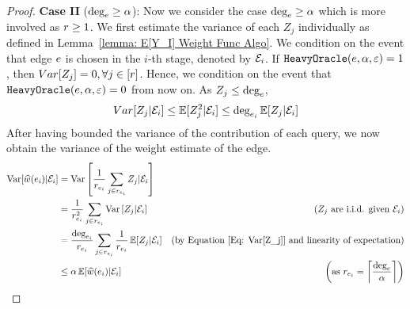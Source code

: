 \begin{lemma}
\begin{proof}
        {\bf Case II }($\mbox{deg}_{e} \geq \alpha$):
        Now we consider the case $\mbox{deg}_{e} \geq \alpha$ which is more involved as $r \geq 1$. We first estimate the variance of each $Z_j$ individually as defined in Lemma~\ref{lemma: E[Y_I] Weight Func Algo}. We condition on the event that edge $e$ is chosen in the $i$-th stage, denoted by $\mathcal{E}_i$. If $\texttt{HeavyOracle}(e,\alpha,\varepsilon) = 1$, then $Var[Z_j] = 0, \forall j \in [r]$. Hence, we condition on the event that $\texttt{HeavyOracle}(e,\alpha,\varepsilon) = 0$ from now on. As $Z_j \leq \mbox{deg}_{e}$,
        \begin{align}
             Var[Z_j|\mathcal{E}_i]  \leq \operatorname*{\mathbb{E}}[Z_j^2|\mathcal{E}_i] 
                                \leq \mbox{deg}_{e_i}\operatorname*{\mathbb{E}}[Z_j|\mathcal{E}_i] \label{Eq: Var[Z_j]}
        \end{align}
        After having bounded the variance of the contribution of each query, we now obtain the variance of the weight estimate of the edge.
        \begin{align}
          \nonumber  \operatorname*{\mathrm{Var}}[\widehat{w}(e_i)|\mathcal{E}_i]   &=\operatorname*{\mathrm{Var}}\left[{\frac{1}{r_{e_i}}\sum_{j \in r_{e_i}} Z_j|\mathcal{E}_i}\right]&\\
          \nonumber                      &=\frac{1}{r_{e_i}^2}\sum_{j \in r_{e_i}}\operatorname*{\mathrm{Var}}\left[ Z_j|\mathcal{E}_i \right]&\text{($Z_j$ are i.i.d. given $\mathcal{E}_i$)}\\
          \nonumber                      &=\frac{\mbox{deg}_{e_i}}{r_{e_i}}\sum_{j \in r_{e_i}}\frac{1}{r_{e_i}}\operatorname*{\mathbb{E}}[ Z_j|\mathcal{E}_i ]&\text{(by Equation~\ref{Eq: Var[Z_j]} and linearity of expectation)}\\
          &\leq \alpha \operatorname*{\mathbb{E}}[\widehat{w}(e_i)|\mathcal{E}_i]&\text{ $\left(\mbox{as }  r_{e_i} = \left\lceil{\frac{\mbox{deg}_{e}}{\alpha}}\right\rceil\right)$}\label{Eq: Var[Y_i,S,High Degree Edge] random edge arboricity}
\end{align}


\end{proof}
\end{lemma}
